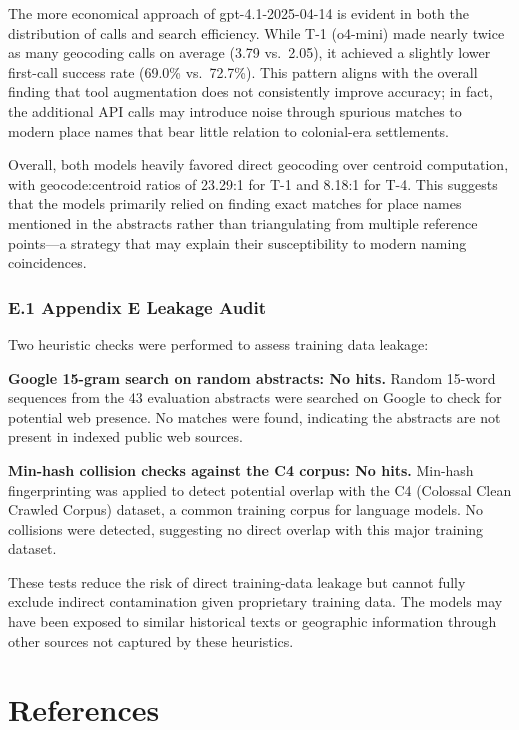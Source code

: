 \documentclass[
  10pt]{article}
\begin{document}
The more economical approach of gpt-4.1-2025-04-14 is evident in both
the distribution of calls and search efficiency. While T-1 (o4-mini)
made nearly twice as many geocoding calls on average (3.79 vs.~2.05), it
achieved a slightly lower first-call success rate (69.0\% vs.~72.7\%).
This pattern aligns with the overall finding that tool augmentation does
not consistently improve accuracy; in fact, the additional API calls may
introduce noise through spurious matches to modern place names that bear
little relation to colonial-era settlements.

Overall, both models heavily favored direct geocoding over centroid
computation, with geocode:centroid ratios of 23.29:1 for T-1 and 8.18:1
for T-4. This suggests that the models primarily relied on finding exact
matches for place names mentioned in the abstracts rather than
triangulating from multiple reference points---a strategy that may
explain their susceptibility to modern naming coincidences.

\subsubsection{E.1 Appendix E Leakage
Audit}\label{e.1-appendix-e-leakage-audit}

Two heuristic checks were performed to assess training data leakage:

\textbf{Google 15-gram search on random abstracts: No hits.} Random
15-word sequences from the 43 evaluation abstracts were searched on
Google to check for potential web presence. No matches were found,
indicating the abstracts are not present in indexed public web sources.

\textbf{Min-hash collision checks against the C4 corpus: No hits.}
Min-hash fingerprinting was applied to detect potential overlap with the
C4 (Colossal Clean Crawled Corpus) dataset, a common training corpus for
language models. No collisions were detected, suggesting no direct
overlap with this major training dataset.

These tests reduce the risk of direct training-data leakage but cannot
fully exclude indirect contamination given proprietary training data.
The models may have been exposed to similar historical texts or
geographic information through other sources not captured by these
heuristics.

\section*{References}\label{references}
\end{document}
